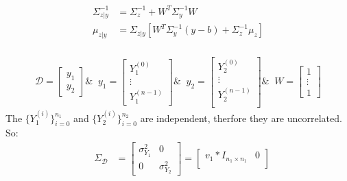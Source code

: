\documentclass[12pt]{article}
\begin{document}
\begin{qsolve}[solution]
\begin{itemize}
              \subitem \begin{align*}
                  \Sigma_{z|y}^{-1} & = \Sigma_z^{-1} + W^T\Sigma_y^{-1}W                       \\
                  \mu_{z|y}         & = \Sigma _{z|y}[W^T\Sigma_y^{-1}(y-b)+\Sigma_z^{-1}\mu_z] \\
              \end{align*}
    \end{itemize}
    \splitqsolve
    \begin{align*}
        \mathcal{D} = \begin{bmatrix}
            y_1 \\
            y_2
        \end{bmatrix}
        \& \; \;
        y_1 = \begin{bmatrix}
            Y_1^{(0)} \\
            \vdots    \\
            Y_1^{(n-1)}
        \end{bmatrix}
        \& \; \;
        y_2 = \begin{bmatrix}
            Y_2^{(0)}   \\
            \vdots      \\
            Y_2^{(n-1)} \\
        \end{bmatrix}
        \& \; \;
        W = \begin{bmatrix}
            1      \\
            \vdots \\
            1
        \end{bmatrix}
    \end{align*}
    The $\{Y_1^{(i)}\}_{i=0}^{n_1}$ and $\{Y_2^{(i)}\}_{i=0}^{n_2}$ are independent, therfore they are uncorrelated.\,So:
    \begin{align*}
         & \Sigma_{\mathcal{D}} & = \begin{bmatrix}
            \sigma_{Y_1}^2 & 0              \\
            0              & \sigma_{Y_2}^2
        \end{bmatrix} =
        \begin{bmatrix}
            v_1 * I_{n_1\times n_1} & 0                       \\

\end{bmatrix}
\end{align*}
\end{qsolve}
\end{document}
